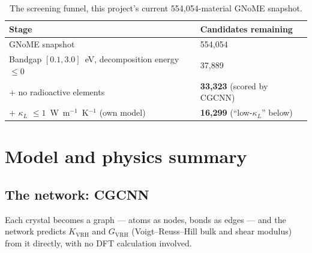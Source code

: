 \documentclass[11pt,a4paper]{article}
\newcommand{\KV}{$K_{\mathrm{VRH}}$}
\newcommand{\GV}{$G_{\mathrm{VRH}}$}
\newcommand{\KL}{$\kappa_L$}
\begin{document}
\begin{table}[H]
\centering
\caption{The screening funnel, this project's current 554{,}054-material
GNoME snapshot.}
\begin{tabular}{p{9.6cm}p{4.7cm}}
\toprule
Stage & Candidates remaining \\
\midrule
GNoME snapshot & 554{,}054 \\
Bandgap $[0.1,3.0]$~eV, decomposition energy $\leq 0$ & 37{,}889 \\
+ no radioactive elements & \textbf{33{,}323} (scored by CGCNN) \\
+ \KL{} $\leq 1$~W~m$^{-1}$~K$^{-1}$ (own model) & \textbf{16{,}299} (``low-\KL{}'' below) \\
\bottomrule
\end{tabular}
\end{table}

\section{Model and physics summary}

\subsection{The network: CGCNN}

Each crystal becomes a graph --- atoms as nodes, bonds as edges --- and the
network predicts \KV{} and \GV{} (Voigt--Reuss--Hill bulk and shear modulus)
from it directly, with no DFT calculation involved.
\end{document}
